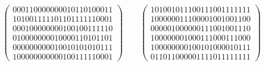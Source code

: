 \documentclass{article}
\theoremstyle{plain}
\theoremstyle{definition}
\begin{document}
\[	
	 \left(\begin{array}{c}
     000110000000010110100011 \\
     101001111101101111110001 \\
     000100000000100100111110 \\
     010000000010000110101101 \\
     000000000010010101010111 \\
     100000000000100111110001
     \end{array}\right)
\qquad
    \left(\begin{array}{c}
	 101001011100111001111111 \\
	 100000011100001001001100 \\
	 000001000000111001001110 \\
	 100000001000111000111000 \\
	 100000000100101000010111 \\
	 011011000001111011111111
	 \end{array}\right)
\]




\end{document}
